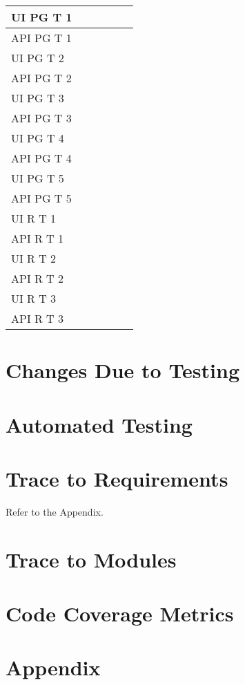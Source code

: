 \documentclass[12pt, titlepage]{article}
\begin{document}
\begin{tabularx}{\textwidth}{|K|K|K|K|K|K|}
	\hline 
	UI PG T 1 &  &  &  &  &  \\
	\hline 
	API PG T 1 &  &  &  &  &  \\
	\hline 
	UI PG T 2 &  &  &  &  &  \\
	\hline 
	API PG T 2 &  &  &  &  &  \\
	\hline 
	UI PG T 3 &  &  &  &  &  \\
	\hline 
	API PG T 3 &  &  &  &  &  \\
	\hline 
	UI PG T 4 &  &  &  &  &  \\
	\hline 
	API PG T 4 &  &  &  &  &  \\
	\hline 
	UI PG T 5 &  &  &  &  &  \\
	\hline 
	API PG T 5 &  &  &  &  &  \\
	\hline 
	UI R T 1 &  &  &  &  &  \\
	\hline 
	API R T 1 &  &  &  &  &  \\
	\hline 
	UI R T 2 &  &  &  &  &  \\
	\hline 
	API R T 2 &  &  &  &  &  \\
	\hline 
	UI R T 3 &  &  &  &  &  \\
	\hline 
	API R T 3 &  &  &  &  &  \\
	\hline
\end{tabularx}


\section{Changes Due to Testing}

\section{Automated Testing}
		
\section{Trace to Requirements}
Refer to the Appendix.
		
\section{Trace to Modules}		

\section{Code Coverage Metrics}

\newpage
\section*{Appendix}
\end{document}
